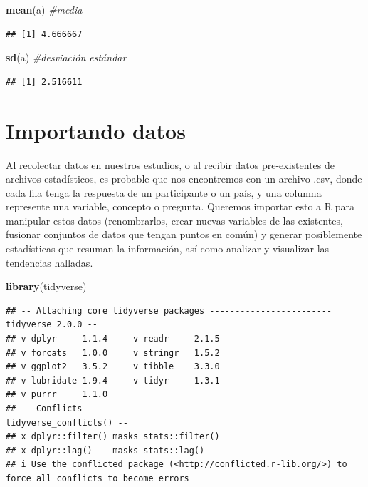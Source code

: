 \documentclass[
]{article}
\newenvironment{Shaded}{\begin{snugshade}}{\end{snugshade}}
\newcommand{\CommentTok}[1]{\textcolor[rgb]{0.56,0.35,0.01}{\textit{#1}}}
\newcommand{\FunctionTok}[1]{\textcolor[rgb]{0.13,0.29,0.53}{\textbf{#1}}}
\newcommand{\NormalTok}[1]{#1}
\begin{document}
\begin{Shaded}
\begin{Highlighting}[]
\FunctionTok{mean}\NormalTok{(a) }\CommentTok{\#media}
\end{Highlighting}
\end{Shaded}

\begin{verbatim}
## [1] 4.666667
\end{verbatim}

\begin{Shaded}
\begin{Highlighting}[]
\FunctionTok{sd}\NormalTok{(a) }\CommentTok{\#desviación estándar}
\end{Highlighting}
\end{Shaded}

\begin{verbatim}
## [1] 2.516611
\end{verbatim}

\section{Importando datos}\label{importando-datos}

Al recolectar datos en nuestros estudios, o al recibir datos
pre-existentes de archivos estadísticos, es probable que nos encontremos
con un archivo .csv, donde cada fila tenga la respuesta de un
participante o un país, y una columna represente una variable, concepto
o pregunta. Queremos importar esto a R para manipular estos datos
(renombrarlos, crear nuevas variables de las existentes, fusionar
conjuntos de datos que tengan puntos en común) y generar posiblemente
estadísticas que resuman la información, así como analizar y visualizar
las tendencias halladas.

\begin{Shaded}
\begin{Highlighting}[]
\FunctionTok{library}\NormalTok{(tidyverse)}
\end{Highlighting}
\end{Shaded}

\begin{verbatim}
## -- Attaching core tidyverse packages ------------------------ tidyverse 2.0.0 --
## v dplyr     1.1.4     v readr     2.1.5
## v forcats   1.0.0     v stringr   1.5.2
## v ggplot2   3.5.2     v tibble    3.3.0
## v lubridate 1.9.4     v tidyr     1.3.1
## v purrr     1.1.0     
## -- Conflicts ------------------------------------------ tidyverse_conflicts() --
## x dplyr::filter() masks stats::filter()
## x dplyr::lag()    masks stats::lag()
## i Use the conflicted package (<http://conflicted.r-lib.org/>) to force all conflicts to become errors
\end{verbatim}
\end{document}
